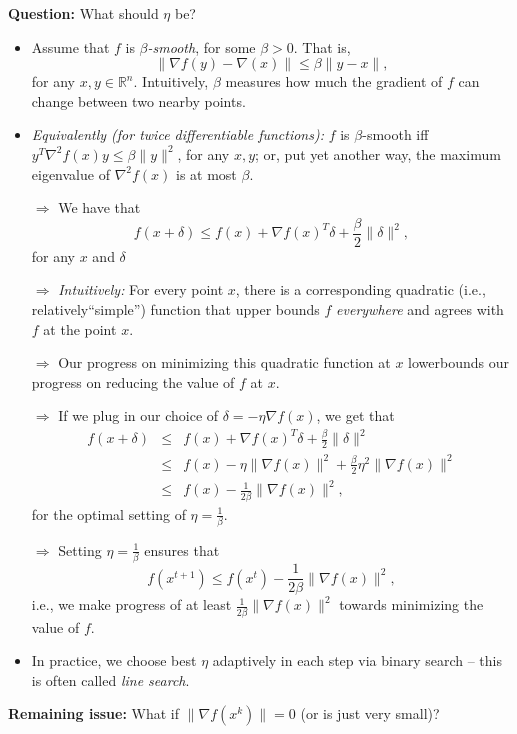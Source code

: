 \documentclass{article}
\newcommand{\RR}{\mathbb{R}}
\begin{document}
{\bf Question:} What should $\eta$ be?
\begin{itemize}
\item Assume that $f$ is {\em $\beta$-smooth}, for some $\beta>0$. That is, 
\[
\|\nabla f(y)-\nabla(x)\| \leq \beta \|y-x\|,
\]
for any $x, y\in \RR^n$. Intuitively, $\beta$ measures how much the gradient of $f$ can change between two nearby points. 
\item {\em Equivalently (for twice differentiable functions):} $f$ is $\beta$-smooth iff $y^T \nabla^2 f(x) y \leq \beta \|y\|^2$, for any $x,y$; or, put yet another way, the maximum eigenvalue of $\nabla^2 f(x)$ is at most $\beta$. 

$\Rightarrow$ We have that
\[
f(x+\delta)\leq f(x) + \nabla f(x)^T \delta + \frac{\beta}{2} \|\delta\|^2,
\]
for any $x$ and $\delta$ 

$\Rightarrow$ {\em Intuitively:} For every point $x$, there is a corresponding quadratic (i.e.,  relatively``simple'') function that upper bounds $f$ {\em everywhere} and agrees with $f$ at the point $x$. 

$\Rightarrow$ Our progress on minimizing this quadratic function at $x$ lowerbounds our progress on reducing the value of $f$ at $x$.

$\Rightarrow$ If we plug in our choice of $\delta=-\eta \nabla f(x)$, we get that
\begin{eqnarray*}
f(x+\delta) &\leq & f(x) + \nabla f(x)^T \delta + \frac{\beta}{2} \|\delta\|^2\\
&\leq & f(x) - \eta \|\nabla f(x)\|^2+ \frac{\beta}{2} \eta^2 \|\nabla f(x)\|^2\\
& \leq & f(x)- \frac{1}{2\beta}  \|\nabla f(x)\|^2,
\end{eqnarray*}
for the optimal setting of $\eta = \frac{1}{\beta}$. 

$\Rightarrow$ Setting $\eta= \frac{1}{\beta}$ ensures that 
\[
f(x^{t+1})\leq f(x^t) -\frac{1}{2\beta}  \|\nabla f(x)\|^2,
\] 
i.e., we make progress of at least $\frac{1}{2\beta}  \|\nabla f(x)\|^2$ towards minimizing the value of $f$. 
\item In practice, we choose best $\eta$ adaptively in each step via binary search -- this is often called {\em line search}.
\end{itemize} 

{\bf Remaining issue:} What if $\|\nabla f(x^k)\|=0$ (or is just very small)?
\end{document}
